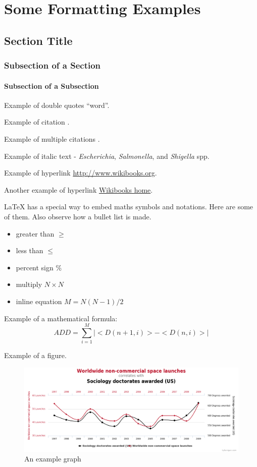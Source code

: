 \chapter{Some Formatting Examples}
\section{Section Title}
\subsection{Subsection of a Section}
\subsubsection{Subsection of a Subsection}

Example of double quotes ``word''. 

Example of citation \citep{altschul1997gapped}.  

Example of multiple citations \citep{altschul1997gapped,baker2007novel}. 

Example of italic text - {\it Escherichia}, {\it Salmonella}, and {\it Shigella} spp. 

Example of hyperlink \url{http://www.wikibooks.org}. 

Another example of hyperlink \href{http://www.wikibooks.org}{Wikibooks home}. 

LaTeX{} has a special way to embed maths symbols and notations. Here are some of them. Also observe how a bullet list is made.

\begin{itemize}\itemsep0pt \parskip0pt 
\item greater than $\ge$
\item less than $\le$
\item percent sign \%
\item multiply $N\times N$
\item inline equation $M = N(N-1)/2$
\end{itemize}

Example of a mathematical formula:
\begin{equation}
  ADD = \sum_{i=1}^{M}|<D(n+1,i)>-<D(n,i)>|
  \label{add}
\end{equation}

Example of a figure.
\begin{figure}[ht!]
\begin{center}
\includegraphics[scale=0.2]{chapter1/images/example_graph.png}
\end{center}
\caption{An example graph}
\label{graph1}
\end{figure}

